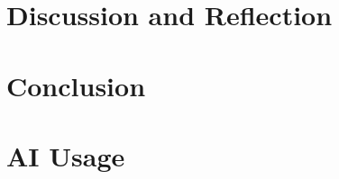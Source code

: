 \documentclass[11pt, a4paper, oneside]{report}
\begin{document}
\chapter[Discussion and Reflection]{Discussion and Reflection}             
\label{chap:reflect}                                            
                             

\chapter[Conclusion]{Conclusion}             
\label{chap:conclusion}                                            
                             

\chapter[AI Usage]{AI Usage}             
\label{chap:ai}                                            
                             

\appendix                                                     
                                 
\end{document}
